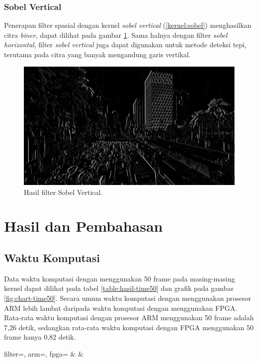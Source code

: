 \subsubsection{Sobel Vertical}
Penerapan filter spasial dengan kernel \textit{sobel vertical} (\ref{kernel:sobel}) menghasilkan citra \textit{biner}, dapat dilihat pada gambar \ref{fig:output-sobelver}. Sama halnya dengan filter \textit{sobel horizontal}, filter \textit{sobel vertical} juga dapat digunakan untuk metode deteksi tepi, terutama pada citra yang banyak mengandung garis vertikal.
\begin{figure}
    \includegraphics[width=0.8\linewidth, center]{images/output-image/input1-sobelver.png}
    \caption{Hasil filter Sobel Vertical.}
    \label{fig:output-sobelver}
\end{figure}



\section{Hasil dan Pembahasan}

\subsection{Waktu Komputasi}

Data waktu komputasi dengan menggunakan 50 frame pada masing-masing kernel dapat dilihat pada tabel \ref{table:hasil-time50} dan grafik pada gambar \ref{fig:chart-time50}. Secara umum waktu komputasi dengan menggunakan prosesor ARM lebih lambat daripada waktu komputasi dengan menggunakan FPGA. Rata-rata waktu komputasi dengan prosesor ARM menggunakan 50 frame adalah 7,26 detik, sedangkan rata-rata waktu komputasi dengan FPGA menggunakan 50 frame hanya 0,82 detik.
\begin{atable}
    \caption{Tabel perbandingan waktu komputasi dengan menggunakan 50 frame.}
    \label{table:hasil-time50}
        {
            filter=\filter, 
            arm=\arm, 
            fpga=\fpga}
        {
            \filter & 
            \arm & 
            \fpga }
\end{atable}

